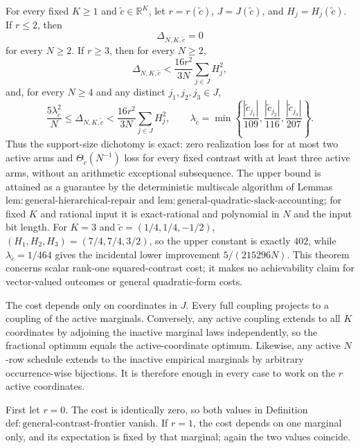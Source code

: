 For every fixed \(K\ge1\) and \(\widetilde c\in\mathbb R^K\), let \(r=r(\widetilde c)\), \(J=J(\widetilde c)\), and \(H_j=H_j(\widetilde c)\).  If \(r\le2\), then
\[
 \Delta_{N,K,\widetilde c}=0
\]
for every \(N\ge2\).  If \(r\ge3\), then for every \(N\ge2\),
\[
 \Delta_{N,K,\widetilde c}
 <\frac{16r^2}{3N}\sum_{j\in J}H_j^2,
\]
and, for every \(N\ge4\) and any distinct \(j_1,j_2,j_3\in J\),
\[
 \frac{5\lambda_{\widetilde c}^2}{N}
 \le\Delta_{N,K,\widetilde c}
 <\frac{16r^2}{3N}\sum_{j\in J}H_j^2,
 \qquad
 \lambda_{\widetilde c}=\min\left\{
 \frac{|\widetilde c_{j_1}|}{109},
 \frac{|\widetilde c_{j_2}|}{116},
 \frac{|\widetilde c_{j_3}|}{207}\right\}.
\]
Thus the support-size dichotomy is exact: zero realization loss for at most two active arms and \(\Theta_{\widetilde c}(N^{-1})\) loss for every fixed contrast with at least three active arms, without an arithmetic exceptional subsequence.  The upper bound is attained as a guarantee by the deterministic multiscale algorithm of Lemmas \(\mathrm{lem{:}general\mbox{-}hierarchical\mbox{-}repair}\) and \(\mathrm{lem{:}general\mbox{-}quadratic\mbox{-}slack\mbox{-}accounting}\); for fixed \(K\) and rational input it is exact-rational and polynomial in \(N\) and the input bit length.  For \(K=3\) and \(\widetilde c=(1/4,1/4,-1/2)\), \((H_1,H_2,H_3)=(7/4,7/4,3/2)\), so the upper constant is exactly \(402\), while \(\lambda_{\widetilde c}=1/464\) gives the incidental lower improvement \(5/(215296N)\).  This theorem concerns scalar rank-one squared-contrast cost; it makes no achievability claim for vector-valued outcomes or general quadratic-form costs.

The cost depends only on coordinates in \(J\).  Every full coupling projects to a coupling of the active marginals.  Conversely, any active coupling extends to all \(K\) coordinates by adjoining the inactive marginal laws independently, so the fractional optimum equals the active-coordinate optimum.  Likewise, any active \(N\)-row schedule extends to the inactive empirical marginals by arbitrary occurrence-wise bijections.  It is therefore enough in every case to work on the \(r\) active coordinates.

First let \(r=0\).  The cost is identically zero, so both values in Definition \(\mathrm{def{:}general\mbox{-}contrast\mbox{-}frontier}\) vanish.  If \(r=1\), the cost depends on one marginal only, and its expectation is fixed by that marginal; again the two values coincide.

